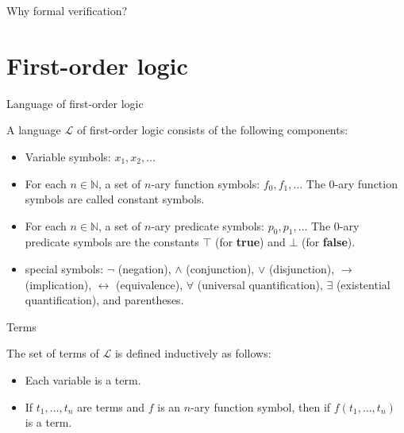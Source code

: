\documentclass{beamer}
\begin{document}
  \begin{frame}{Why formal verification?}
  
  \end{frame}

\section{First-order logic}
\begin{frame}{Language of first-order logic}
  
    A language $\mathscr{L}$ of first-order logic consists of the following components:
    \begin{itemize}
    \item Variable symbols: $x_1, x_2, \ldots$
    \item For each $n\in\mathbb{N}$, a set of $n$-ary function symbols: $f_0, f_1, \ldots$ The 0-ary function symbols are called constant symbols.
    \item For each $n\in\mathbb{N}$, a set of $n$-ary predicate symbols: $p_0, p_1, \ldots$ The 0-ary predicate symbols are the constants $\top$ (for \textbf{true}) and $\bot$ (for \textbf{false}).
    \item special symbols: $\neg$ (negation), $\wedge$ (conjunction), $\vee$ (disjunction), $\rightarrow$ (implication), $\leftrightarrow$ (equivalence), $\forall$ (universal quantification), $\exists$ (existential quantification), and parentheses.
  \end{itemize}

  \end{frame}

  \begin{frame}{Terms}

    The set of terms of $\mathscr{L}$ is defined inductively as follows:
    \begin{itemize}
    \item Each variable is a term.
    \item If $t_1, \ldots, t_n$ are terms and $f$ is an $n$-ary function symbol, then if $f(t_1, \ldots, t_n)$ is a term.
  \end{itemize}
  \end{frame}
\end{document}
